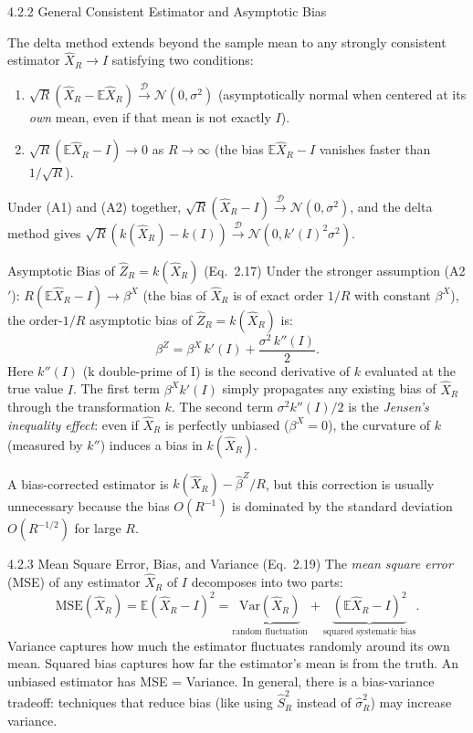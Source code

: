 \documentclass[aspectratio=169,10pt]{beamer}
\begin{document}
\begin{frame}[allowframebreaks]{4.2.2 General Consistent Estimator and Asymptotic Bias}

The delta method extends beyond the sample mean to any strongly
consistent estimator $\hat{X}_R \to I$ satisfying two conditions:
\begin{enumerate}[(A1)]
  \item $\sqrt{R}(\hat{X}_R - \mathbb{E}\hat{X}_R)
    \xrightarrow{\mathcal{D}} \mathcal{N}(0, \sigma^2)$
    (asymptotically normal when centered at its \emph{own} mean,
    even if that mean is not exactly $I$).
  \item $\sqrt{R}(\mathbb{E}\hat{X}_R - I) \to 0$ as $R \to \infty$
    (the bias $\mathbb{E}\hat{X}_R - I$ vanishes faster than $1/\sqrt{R}$).
\end{enumerate}
Under (A1) and (A2) together, $\sqrt{R}(\hat{X}_R - I) \xrightarrow{\mathcal{D}}
\mathcal{N}(0, \sigma^2)$, and the delta method gives
$\sqrt{R}(k(\hat{X}_R) - k(I)) \xrightarrow{\mathcal{D}} \mathcal{N}(0, k'(I)^2\sigma^2)$.

\begin{block}{Asymptotic Bias of $\hat{Z}_R = k(\hat{X}_R)$ (Eq.\ 2.17)}
  Under the stronger assumption (A2$'$): $R(\mathbb{E}\hat{X}_R - I) \to \beta^X$
  (the bias of $\hat{X}_R$ is of exact order $1/R$ with constant
  $\beta^X$), the order-$1/R$ asymptotic bias of $\hat{Z}_R = k(\hat{X}_R)$
  is:
  \[
    \beta^Z = \beta^X\,k'(I) + \frac{\sigma^2\,k''(I)}{2}. \tag{2.17}
  \]
  Here $k''(I)$ (k double-prime of I) is the second derivative of $k$
  evaluated at the true value $I$.  The first term $\beta^X k'(I)$ simply
  propagates any existing bias of $\hat{X}_R$ through the transformation $k$.
  The second term $\sigma^2 k''(I)/2$ is the \emph{Jensen's inequality
  effect}: even if $\hat{X}_R$ is perfectly unbiased ($\beta^X = 0$),
  the curvature of $k$ (measured by $k''$) induces a bias in $k(\hat{X}_R)$.

  A bias-corrected estimator is $k(\hat{X}_R) - \hat{\beta}^Z/R$, but
  this correction is usually unnecessary because the bias $O(R^{-1})$
  is dominated by the standard deviation $O(R^{-1/2})$ for large $R$.
\end{block}

\framebreak

\begin{block}{4.2.3 Mean Square Error, Bias, and Variance (Eq.\ 2.19)}
  The \emph{mean square error} (MSE) of any estimator $\hat{X}_R$ of $I$
  decomposes into two parts:
  \[
    \mathrm{MSE}(\hat{X}_R)
      = \mathbb{E}(\hat{X}_R - I)^2
      = \underbrace{\mathrm{Var}(\hat{X}_R)}_{\text{random fluctuation}}
        + \underbrace{(\mathbb{E}\hat{X}_R - I)^2}_{\text{squared systematic bias}}.
  \]
  Variance captures how much the estimator fluctuates randomly around
  its own mean.  Squared bias captures how far the estimator's mean is
  from the truth.  An unbiased estimator has MSE = Variance.  In
  general, there is a bias-variance tradeoff: techniques that reduce
  bias (like using $\hat{S}_R^2$ instead of $\hat{\sigma}_R^2$) may
  increase variance.
\end{block}


\end{frame}
\end{document}
